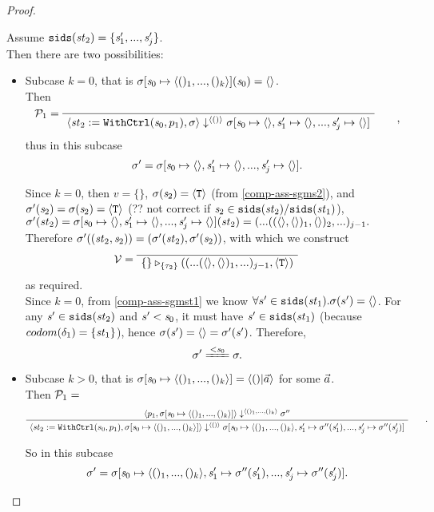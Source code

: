 \begin{proof}
\begin{itemize}
\begin{enumerate}[(i)]
	Assume $\mathtt{sids}(\mathit{st}_2) = \{\mathit{s}'_1,...,\mathit{s}'_j\}$.\\
	
	Then there are two possibilities:
	\begin{itemize}
	\item 
	Subcase $k=0$, that is $\sgmsz(\s_0) = \emptyv$.\\
	Then
	$$\PT{
		\AC{}
		\LeLa{\MP_1 = }
		\UC{\seval{\withctrl{\s_0}{p_1}{\st_2}}{\sgm}{\< () \'>}
			{\sgm[\s_0 \|-> \emptyv, \s_1' \|-> \emptyv, ..., \s_j' \|-> \emptyv]}}
	  },$$ 
    thus in this subcase 
    $$\sgm' = \sgm[\s_0 \|-> \emptyv, \s_1' \|-> \emptyv, ..., \s_j' \|-> \emptyv].$$ 

\def\sgmpempty{\sgm[\s_0 \|-> \emptyv, \s_1' \|-> \emptyv, ..., \s_j' \|-> \emptyv]}

	Since $k=0$, then $v = \{ \}$, $\sigma(\mathit{s}_2) = \langle \mathtt{T} \rangle$ (from \eqref{comp-ass-sgms2}), and \\
	{\color{red} $\sigma'(\mathit{s}_2) = \sigma(\mathit{s}_2) = \langle \mathtt{T} \rangle$ (?? not correct if $\mathit{s}_2 \in \mathtt{sids}(\mathit{st}_2)/\mathtt{sids}(\mathit{st}_1)$)}, \\
	$\sgm'(\st_2) = \sgmpempty(\st_2) = (...((\emptyv,\emptyv)_1,\emptyv)_2,...)_{j-1}.$ \\
	
	Therefore $\sigma'((\mathit{st}_2,\mathit{s}_2)) = (\sigma'(\mathit{st}_2), \sigma'(\mathit{s}_2))$, with which we construct 
	$$\MV = 
	\PT{\Axiom{\ValRep{\{\}}{\tseq{\tau_2}}{((...(\emptyv,\emptyv)_1,...)_{j-1},\oT)}}}$$ 
	as required.\\
    
    Since $k=0$, from \eqref{comp-ass-sgmst1} we know $\forall s' \in \mathtt{sids}(\mathit{st}_1). \sigma(s') = \langle \rangle$. 
    For any $\mathit{s}' \in \mathtt{sids}(\mathit{st}_2)$ and $s' < \mathit{s}_0$, it must have $\mathit{s}' \in \mathtt{sids}(\mathit{st}_1)$ 
    (because $codom(\delta_1) = \{\mathit{st}_1\}$), hence $\sigma(\mathit{s}') = \langle \rangle = \sigma'(\mathit{s}')$. 
    Therefore, $$\sgm' \ConEq{\s_0} \sgm.$$
    

\def\kunit{\vrange{()_1}{()_k}}
\def\sgmp-nonempty{\sgm[\s_0 \|-> \kunit, \s_1' \|-> \sgm''(\s'_1),...,
	\s'_j \|-> \sgm''(\s'_j)]}  

	\item \label{subcase-2} 
	Subcase $k > 0$, that is $\sgmsz = \< ()|\a \'>$ for some $\vec a$. \\
	Then $\mathcal{P}_1 = $
	$$\PT{
		\AC{\seval{p_1}{\sgmsz}{\kunit}{\sgm''}}
		\UC{\seval{\withctrl {s_0} {p_1} {\st_2} } 
				  {\sgmsz} 
				  {\vunit} 
				  {\sgmp-nonempty}}
	}.$$
	
	So in this subcase $$\sgm' = \sgmp-nonempty.$$
	

\end{itemize}
\end{enumerate}
\end{itemize}
\end{proof}
